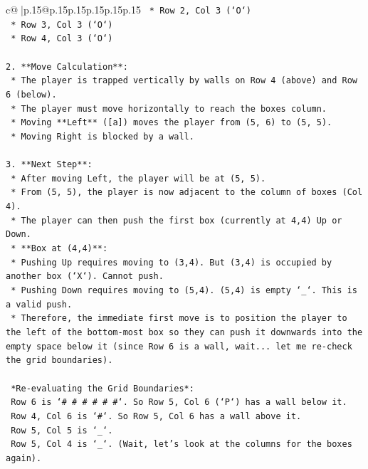 \documentclass{article}
\begin{document}
{\begin{supertabular}{c@{$\;$}|p{.15\linewidth}@{}p{.15\linewidth}p{.15\linewidth}p{.15\linewidth}p{.15\linewidth}p{.15\linewidth}}
{{{\texttt{        *   Row 2, Col 3 (`O`)} \\
\texttt{        *   Row 3, Col 3 (`O`)} \\
\texttt{        *   Row 4, Col 3 (`O`)} \\
\\ 
\texttt{2.  **Move Calculation**:} \\
\texttt{    *   The player is trapped vertically by walls on Row 4 (above) and Row 6 (below).} \\
\texttt{    *   The player must move horizontally to reach the boxes column.} \\
\texttt{    *   Moving **Left** ({[}a{]}) moves the player from (5, 6) to (5, 5).} \\
\texttt{    *   Moving Right is blocked by a wall.} \\
\\ 
\texttt{3.  **Next Step**:} \\
\texttt{    *   After moving Left, the player will be at (5, 5).} \\
\texttt{    *   From (5, 5), the player is now adjacent to the column of boxes (Col 4).} \\
\texttt{    *   The player can then push the first box (currently at 4,4) Up or Down.} \\
\texttt{    *   **Box at (4,4)**:} \\
\texttt{        *   Pushing Up requires moving to (3,4). But (3,4) is occupied by another box (`X`). Cannot push.} \\
\texttt{        *   Pushing Down requires moving to (5,4). (5,4) is empty `\_`. This is a valid push.} \\
\texttt{    *   Therefore, the immediate first move is to position the player to the left of the bottom{-}most box so they can push it downwards into the empty space below it (since Row 6 is a wall, wait... let me re{-}check the grid boundaries).} \\
\\ 
\texttt{    *Re{-}evaluating the Grid Boundaries*:} \\
\texttt{    Row 6 is `\# \# \# \# \# \#`. So Row 5, Col 6 (`P`) has a wall below it.} \\
\texttt{    Row 4, Col 6 is `\#`. So Row 5, Col 6 has a wall above it.} \\
\texttt{    Row 5, Col 5 is `\_`.} \\
\texttt{    Row 5, Col 4 is `\_`. (Wait, let's look at the columns for the boxes again).} \\
}}}
\end{supertabular}}
\end{document}
